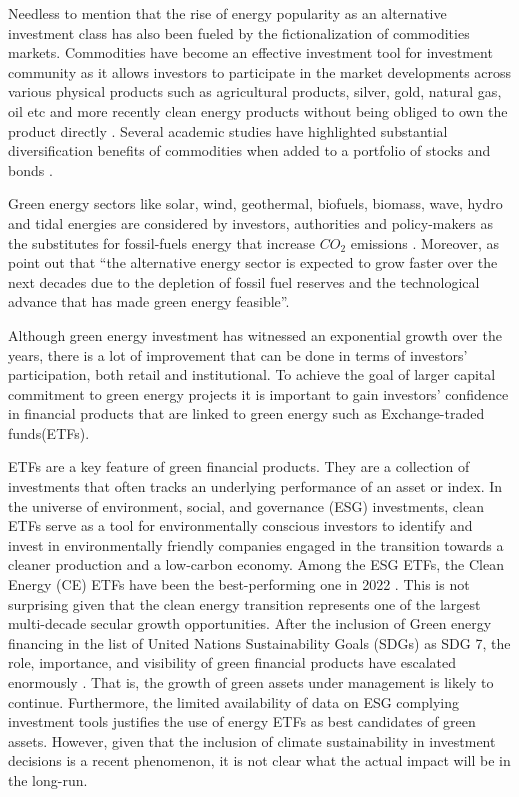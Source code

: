 \documentclass[
  letterpaper,
  DIV=11,
  numbers=noendperiod]{scrartcl}
\begin{document}
Needless to mention that the rise of energy popularity as an alternative
investment class has also been fueled by the fictionalization of
commodities markets. Commodities have become an effective investment
tool for investment community as it allows investors to participate in
the market developments across various physical products such as
agricultural products, silver, gold, natural gas, oil etc and more
recently clean energy products without being obliged to own the product
directly \citep{gagnon2020they}. Several academic studies have
highlighted substantial diversification benefits of commodities when
added to a portfolio of stocks and bonds \citep[see inter
alia,][]{naqvi2022}.

Green energy sectors like solar, wind, geothermal, biofuels, biomass,
wave, hydro and tidal energies are considered by investors, authorities
and policy-makers as the substitutes for fossil-fuels energy that
increase \(CO_2\) emissions \citep{shahzad2020clean}. Moreover, as
\citet{naqvi2022} point out that ``the alternative energy sector is
expected to grow faster over the next decades due to the depletion of
fossil fuel reserves and the technological advance that has made green
energy feasible''.

Although green energy investment has witnessed an exponential growth
over the years, there is a lot of improvement that can be done in terms
of investors' participation, both retail and institutional. To achieve
the goal of larger capital commitment to green energy projects it is
important to gain investors' confidence in financial products that are
linked to green energy such as Exchange-traded funds(ETFs).

ETFs are a key feature of green financial products. They are a
collection of investments that often tracks an underlying performance of
an asset or index. In the universe of environment, social, and
governance (ESG) investments, clean ETFs serve as a tool for
environmentally conscious investors to identify and invest in
environmentally friendly companies \citep{briere2023} engaged in the
transition towards a cleaner production and a low-carbon economy. Among
the ESG ETFs, the Clean Energy (CE) ETFs have been the best-performing
one in 2022 \citep{decclesia2024}. This is not surprising given that the
clean energy transition represents one of the largest multi-decade
secular growth opportunities. After the inclusion of Green energy
financing in the list of United Nations Sustainability Goals (SDGs) as
SDG 7, the role, importance, and visibility of green financial products
have escalated enormously \citep{naqvi2022}. That is, the growth of
green assets under management is likely to continue. Furthermore, the
limited availability of data on ESG complying investment tools
\citep{avramov2022, nguyen2025} justifies the use of energy ETFs as best
candidates of green assets. However, given that the inclusion of climate
sustainability in investment decisions is a recent phenomenon, it is not
clear what the actual impact will be in the long-run.
\end{document}
